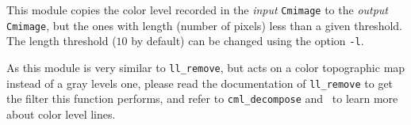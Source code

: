 This module copies the color level recorded in the 
{\em input} {\tt Cmimage} to the {\em output} {\tt Cmimage}, 
but the ones with length (number of pixels) less than a given threshold. 
The length threshold ($10$ by default) can be changed using the option
\verb+-l+.

As this module is very similar to {\tt ll\_remove}, but acts on a 
color topographic map instead of a 
gray levels one, please read the documentation of {\tt ll\_remove}
to get the filter this function performs, and refer to {\tt cml\_decompose} 
and~\cite{coll.froment:topographic} to learn more about color level lines.
